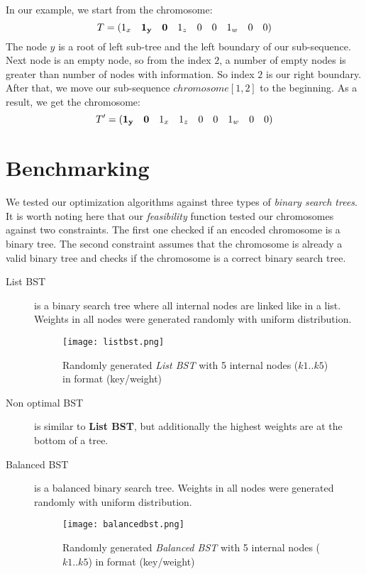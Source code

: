 \documentclass[12pt]{article}
\begin{document}
In our example, we start from the chromosome:
\[
    T = (1_x \quad {\bf 1_y\quad 0} \quad 1_z \quad 0 \quad 0 \quad 1_w \quad 0 \quad 0)
\]
The node $y$ is a root of left sub-tree and the left boundary of our sub-sequence. Next node is an empty node, so from the index $2$, a number of empty nodes is greater than number of nodes with information. So index $2$ is our right boundary. After that, we move our sub-sequence $chromosome[1, 2]$ to the beginning. As a result, we get the chromosome:
\[
    T' = ({\bf 1_y\quad 0} \quad 1_x \quad  1_z \quad 0 \quad 0 \quad 1_w \quad 0 \quad 0)
\]


\clearpage


\section{Benchmarking}
We tested our optimization algorithms against three types of \textit{binary search trees}. It is worth noting here that our \textit{feasibility} function tested our chromosomes against two constraints. The first one checked if an encoded chromosome is a binary tree. The second constraint assumes that the chromosome is already a valid binary tree and checks if the chromosome is a correct binary search tree.

\begin{description}
\item[List BST] is a binary search tree where all internal nodes are linked like in a list. Weights in all nodes were generated randomly with uniform distribution.
\begin{figure}[ht]
\centering
\texttt{[image: listbst.png]}
\caption{Randomly generated \textit{List BST} with 5 internal nodes ($k1..k5$) in format (key/weight)}
\label{fig:listbst}
\end{figure}


\item[Non optimal BST] is similar to \textbf{List BST}, but additionally the highest weights are at the bottom of a tree.
\item[Balanced BST] is a balanced binary search tree. Weights in all nodes were generated randomly with uniform distribution.
\begin{figure}[ht]
\centering
\texttt{[image: balancedbst.png]}
\caption{Randomly generated \textit{Balanced BST} with 5 internal nodes ($k1..k5$) in format (key/weight)}
\label{fig:balancedbst}
\end{figure}
\end{description}
\end{document}
